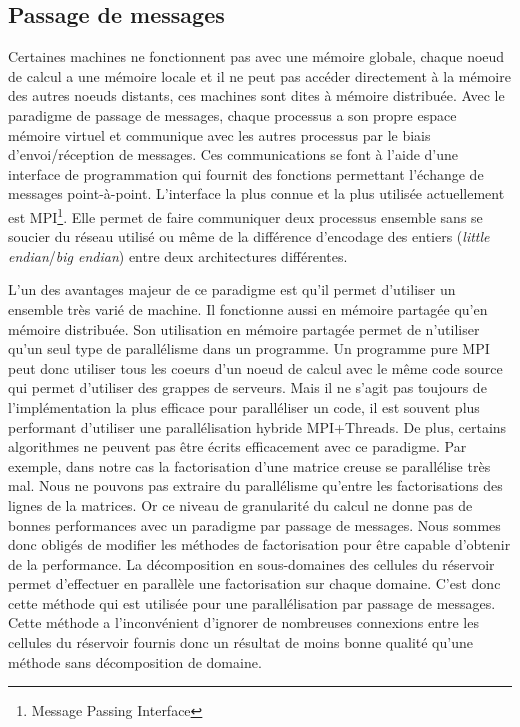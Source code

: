 \subsection{Passage de messages}
Certaines machines ne fonctionnent pas avec une mémoire globale, chaque noeud de calcul a une mémoire locale et il ne peut pas accéder directement à la mémoire des autres noeuds distants, ces machines sont dites à mémoire distribuée.
%
Avec le paradigme de passage de messages, chaque processus a son propre espace mémoire virtuel et communique avec les autres processus par le biais d'envoi/réception de messages.
%
Ces communications se font à l'aide d'une interface de programmation qui fournit des fonctions permettant l'échange de messages point-à-point.
%
L'interface la plus connue et la plus utilisée actuellement est MPI\footnote{Message Passing Interface}.
%
Elle permet de faire communiquer deux processus ensemble sans se soucier du réseau utilisé ou même de la différence d'encodage des entiers ({\em little endian}/{\em big endian}) entre deux architectures différentes.


L'un des avantages majeur de ce paradigme est qu'il permet d'utiliser un ensemble très varié de machine.
%
Il fonctionne aussi en mémoire partagée qu'en mémoire distribuée.
%
Son utilisation en mémoire partagée permet de n'utiliser qu'un seul type de parallélisme dans un programme.
%
Un programme pure MPI peut donc utiliser tous les coeurs d'un noeud de calcul avec le même code source qui permet d'utiliser des grappes de serveurs.
%
Mais il ne s'agit pas toujours de l'implémentation la plus efficace pour paralléliser un code, il est souvent plus performant d'utiliser une parallélisation hybride MPI+Threads\cite{mpi_openmp}.
%
De plus, certains algorithmes ne peuvent pas être écrits efficacement avec ce paradigme.
%
Par exemple, dans notre cas la factorisation d'une matrice creuse se parallélise très mal.
%
Nous ne pouvons pas extraire du parallélisme qu'entre les factorisations des lignes de la matrices.
%
Or ce niveau de granularité du calcul ne donne pas de bonnes performances avec un paradigme par passage de messages.
%
Nous sommes donc obligés de modifier les méthodes de factorisation pour être capable d'obtenir de la performance.
%
La décomposition en sous-domaines des cellules du réservoir permet d'effectuer en parallèle une factorisation sur chaque domaine.
%
C'est donc cette méthode qui est utilisée pour une parallélisation par passage de messages.
%
Cette méthode a l'inconvénient d'ignorer de nombreuses connexions entre les cellules du réservoir fournis donc un résultat de moins bonne qualité qu'une méthode sans décomposition de domaine.
